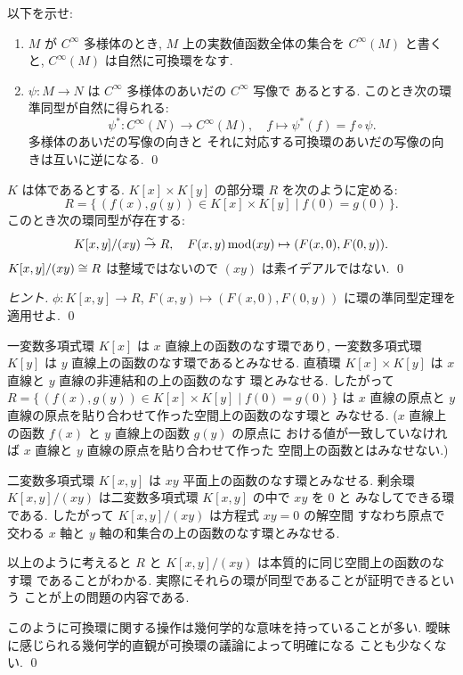 \documentclass[12pt,twoside]{jarticle}
\begin{document}
\begin{question}
 以下を示せ:
 \begin{enumerate}
  \item $M$ が $C^\infty$ 多様体のとき, %
   $M$ 上の実数値函数全体の集合を $C^\infty(M)$ と書くと, %
   $C^\infty(M)$ は自然に可換環をなす.
  \item $\psi:M\to N$ は $C^\infty$ 多様体のあいだの $C^\infty$ 写像で
   あるとする. このとき次の環準同型が自然に得られる:
   \begin{equation*}
    \psi^*:C^\infty(N)\to C^\infty(M), \quad f \mapsto \psi^*(f)=f\circ\psi.
   \end{equation*}
   多様体のあいだの写像の向きと
   それに対応する可換環のあいだの写像の向きは互いに逆になる.
   \qed
 \end{enumerate}
\end{question}

\begin{question}
 $K$ は体であるとする.
 $K[x]\times K[y]$ の部分環 $R$ を次のように定める:
 \begin{equation*}
  R = \{\, (f(x),g(y))\in K[x]\times K[y] \mid f(0)=g(0) \,\}.
 \end{equation*}
 このとき次の環同型が存在する:
 \begin{equation*}
  K[x,y]/(xy)\overset\sim\rightarrow R, \quad F(x,y) \mathop{\mathrm{mod}}\nolimits (xy) \mapsto (F(x,0), F(0,y)).
 \end{equation*}
 $K[x,y]/(xy)\cong R$ は整域ではないので $(xy)$ は素イデアルではない.
 \qed
\end{question}

\begin{proof}[ヒント]
 $\phi:K[x,y]\to R$, $F(x,y)\mapsto (F(x,0),F(0,y))$ に環の準同型定理を
 適用せよ. \qed
\end{proof}

\begin{guide}[上の問題の幾何学的意味]
 一変数多項式環 $K[x]$ は $x$ 直線上の函数のなす環であり, 
 一変数多項式環 $K[y]$ は $y$ 直線上の函数のなす環であるとみなせる.
 直積環 $K[x]\times K[y]$ は $x$ 直線と $y$ 直線の非連結和の上の函数のなす
 環とみなせる.
 したがって $R= \{\, (f(x),g(y))\in K[x]\times K[y] \mid f(0)=g(0) \,\}$ は
 $x$ 直線の原点と $y$ 直線の原点を貼り合わせて作った空間上の函数のなす環と
 みなせる. ($x$ 直線上の函数 $f(x)$ と $y$ 直線上の函数 $g(y)$ の原点に
 おける値が一致していなければ $x$ 直線と $y$ 直線の原点を貼り合わせて作った
 空間上の函数とはみなせない.)

 二変数多項式環 $K[x,y]$ は $xy$ 平面上の函数のなす環とみなせる.
 剰余環 $K[x,y]/(xy)$ は二変数多項式環 $K[x,y]$ の中で $xy$ を $0$ と
 みなしてできる環である. したがって $K[x,y]/(xy)$ は方程式 $xy=0$ の解空間
 すなわち原点で交わる $x$ 軸と $y$ 軸の和集合の上の函数のなす環とみなせる.

 以上のように考えると $R$ と $K[x,y]/(xy)$ は本質的に同じ空間上の函数のなす環
 であることがわかる. 実際にそれらの環が同型であることが証明できるという
 ことが上の問題の内容である.

 このように可換環に関する操作は幾何学的な意味を持っていることが多い.
 曖昧に感じられる幾何学的直観が可換環の議論によって明確になる
 ことも少なくない. 
 \qed
\end{guide}
\end{document}
